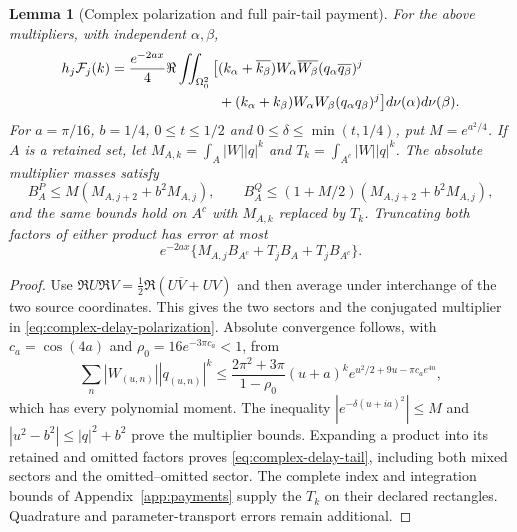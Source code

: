 \documentclass[11pt]{article}
\numberwithin{equation}{section}
\newtheorem{lemma}[theorem]{Lemma}
\theoremstyle{definition}
\theoremstyle{remark}
\begin{document}
\begin{lemma}[Complex polarization and full pair-tail payment]
\label{lem:complex-delay-polarization}
For the above multipliers, with independent $\alpha,\beta$,
\begin{align}
 h_j\mathcal F_j(k)=\frac{e^{-2ax}}4\Re\iint_{\Omega_0^2}
 \big[&(k_\alpha+\overline{k_\beta})W_\alpha\overline{W_\beta}
                       (q_\alpha\overline{q_\beta})^j\notag\\
     &+(k_\alpha+k_\beta)W_\alpha W_\beta(q_\alpha q_\beta)^j
 \big]d\nu(\alpha)d\nu(\beta).
 \label{eq:complex-delay-polarization}
\end{align}
For $a=\pi/16$, $b=1/4$, $0\le t\le1/2$ and
$0\le\delta\le\min(t,1/4)$, put $M=e^{a^2/4}$.  If $A$ is
a retained set, let $M_{A,k}=\int_A|W||q|^k$ and
$T_k=\int_{A^c}|W||q|^k$.  The absolute multiplier masses satisfy
\[
 B_A^P\le M(M_{A,j+2}+b^2M_{A,j}),\qquad
 B_A^Q\le(1+M/2)(M_{A,j+2}+b^2M_{A,j}),
\]
and the same bounds hold on $A^c$ with $M_{A,k}$ replaced by $T_k$.
Truncating both factors of either product has error at most
\begin{equation}
 e^{-2ax}\{M_{A,j}B_{A^c}+T_jB_A+T_jB_{A^c}\}.
 \label{eq:complex-delay-tail}
\end{equation}
\end{lemma}
\begin{proof}
Use $\Re U\Re V=\frac12\Re(U\overline V+UV)$ and then average
under interchange of the two source coordinates.  This gives the two
sectors and the conjugated multiplier in
\eqref{eq:complex-delay-polarization}.  Absolute convergence follows,
with $c_a=\cos(4a)$ and $\rho_0=16e^{-3\pi c_a}<1$, from
\[
 \sum_n|W_{(u,n)}||q_{(u,n)}|^k
 \le\frac{2\pi^2+3\pi}{1-\rho_0}(u+a)^k
           e^{u^2/2+9u-\pi c_a e^{4u}},
\]
which has every polynomial moment.  The inequality
$|e^{-\delta(u+ia)^2}|\le M$ and
$|u^2-b^2|\le|q|^2+b^2$ prove the multiplier bounds.  Expanding a
product into its retained and omitted factors proves
\eqref{eq:complex-delay-tail}, including both mixed sectors and the
omitted--omitted sector.  The complete index and integration bounds of
Appendix~\ref{app:payments} supply the $T_k$ on their declared
rectangles.  Quadrature and parameter-transport errors remain additional.
\end{proof}
\end{document}
